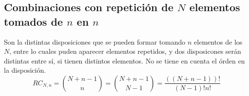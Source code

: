 \subsection{Combinaciones con repetición de $N$ elementos tomados de $n$ en $n$}

\begin{defn}
  Son la distintas disposiciones que se pueden formar tomando $n$ elementos de los $N$, entre lo cuales puden aparecer elementos repetidos, y dos disposicones serán distintas entre sí, si tienen distintos elementos. No se tiene en cuenta el órden en la disposición.
  \[ 
    RC_{N, n}  = \binom{N+ n -1}{n} = \binom{N + n -1}{N -1} = \frac{((N + n -1))!}{(N-1)! n!}
  \] 
\end{defn}
